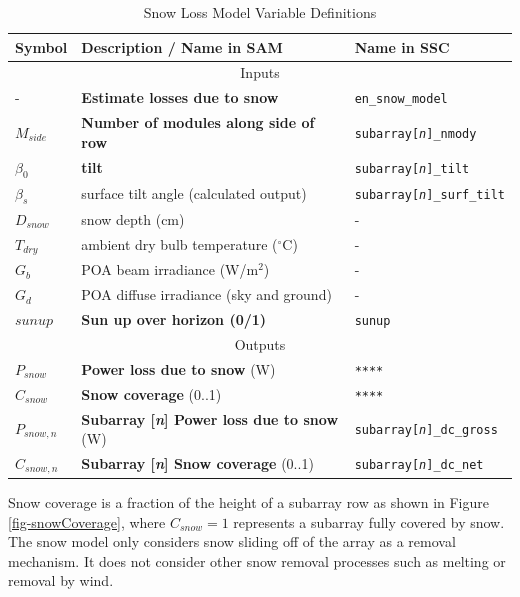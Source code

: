 \documentclass[12pt,letterpaper]{article}
\begin{document}
\begin{table}
\begin{center}
\caption{Snow Loss Model Variable Definitions}
\begin{tabular}{lll}
\midrule
Symbol & Description / \textbf{Name in SAM} & Name in SSC \\
\midrule
\multicolumn{3}{c}{Inputs}\\
- & \textbf{Estimate losses due to snow} & \texttt{en\_snow\_model} \\
$M_{side}$ & \textbf{Number of modules along side of row} &  \texttt{subarray[\textit{n}]\_nmody}\\
$\beta_0$ & \textbf{tilt} & \texttt{subarray[\textit{n}]\_tilt}\\
$\beta_s$ & surface tilt angle (calculated output) & \texttt{subarray[\textit{n}]\_surf\_tilt}\\
$D_{snow}$ & snow depth (cm) & - \\
$T_{dry}$ & ambient dry bulb temperature ($^\circ$C) & - \\
$G_{b}$ & POA beam irradiance (W/m$^2$)& - \\
$G_{d}$ & POA diffuse irradiance (sky and ground) & - \\
$\mathit{sunup}$ & \textbf{Sun up over horizon (0/1)} & \texttt{sunup} \\
\midrule
\multicolumn{3}{c}{Outputs}\\
$P_{snow}$ & \textbf{Power loss due to snow} (W) & \texttt{****} \\
$C_{snow}$ & \textbf{Snow coverage} (0..1) & \texttt{****} \\
$P_{snow,n}$ & \textbf{Subarray [\textit{n}] Power loss due to snow} (W) &  \texttt{subarray[\textit{n}]\_dc\_gross} \\
$C_{snow,n}$ & \textbf{Subarray [\textit{n}] Snow coverage} (0..1) &  \texttt{subarray[\textit{n}]\_dc\_net} \\
\hline
\end{tabular}
\label{tab-snowvars}
\end{center}
\end{table}

Snow coverage is a fraction of the height of a subarray row as shown in Figure \ref{fig-snowCoverage}, where $C_{snow}=1$ represents a subarray fully covered by snow. The snow model only considers snow sliding off of the array as a removal mechanism. It does not consider other snow removal processes such as melting or removal by wind.
\end{document}
